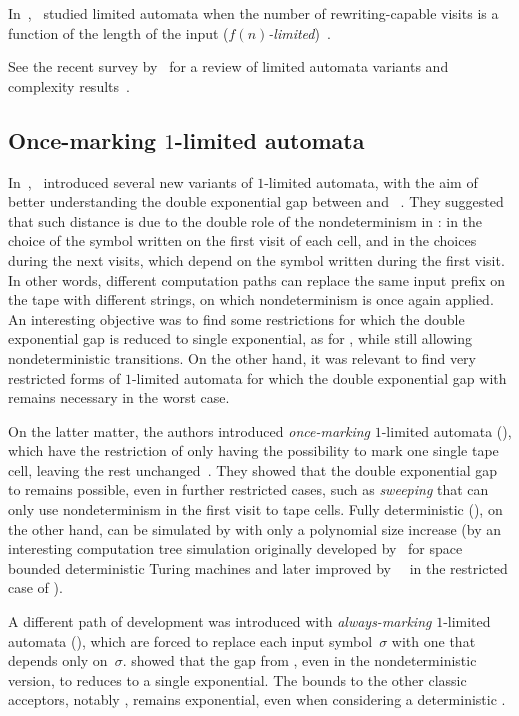 In~\citeyear{WecBra79},~\citeauthor{WecBra79} studied limited automata when the number of rewriting-capable visits is a function of the length of the input (\emph{$f(n)$-limited})~\cite{WecBra79}.

See the recent survey by~\citeauthor{Pig19} for a review of limited automata variants and complexity results~\cite{Pig19}.


\subsection{Once-marking \texorpdfstring{$1$}{1}-limited automata}
In~\citeyear{PigPri23a},~\citeauthor{PigPri23a} introduced several new variants of $1$-limited automata, with the aim of better understanding the double exponential gap between \OLA and \ODFA~\cite{PigPri23a,PigPri23}.
They suggested that such distance is due to the double role of the nondeterminism in \OLAs: in the choice of the symbol written on the first visit of each cell, and in the choices during the next visits, which depend on the symbol written during the first visit.
In other words, different computation paths can replace the same input prefix on the tape with different strings, on which nondeterminism is once again applied.
An interesting objective was to find some restrictions for which the double exponential gap is reduced to single exponential, as for \ODLA, while still allowing nondeterministic transitions.
On the other hand, it was relevant to find very restricted forms of $1$-limited automata for which the double exponential gap with \ODFA remains necessary in the worst case.

On the latter matter, the authors introduced \emph{once-marking} $1$-limited automata (\OMOLA), which have the restriction of only having the possibility to mark one single tape cell, leaving the rest unchanged~\cite{PigPri23}.
They showed that the double exponential gap to \ODFA remains possible, even in further restricted cases, such as \emph{sweeping} \OMOLA that can only use nondeterminism in the first visit to tape cells.
Fully deterministic \OMOLA (\OMODLA), on the other hand, can be simulated by \TDFAs with only a polynomial size increase (by an interesting computation tree simulation originally developed by~\citeauthor{Sip80a} for space bounded deterministic Turing machines and later improved by~\citeauthor{GefMer+07}~\cite{Sip80a,GefMer+07} in the restricted case of \TDFAs).

A different path of development was introduced with \emph{always-marking} $1$-limited automata (\AMOLA), which are forced to replace each input symbol~$\sigma$ with one that depends only on~$\sigma$.
\citeauthor{PigPri23a} showed that the gap from \AMOLA, even in the nondeterministic version, to \ODFA reduces to a single exponential.
The bounds to the other classic acceptors, notably \TNFA, remains exponential, even when considering a deterministic \AMOLA.

